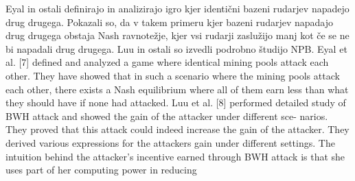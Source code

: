 \documentclass[12pt]{article}
\begin{document}
Eyal \cite{minnersdilemma} in ostali definirajo in analizirajo igro kjer identični bazeni rudarjev napadejo drug drugega. Pokazali so, da v takem primeru kjer bazeni rudarjev napadajo drug drugega obstaja Nash ravnotežje, kjer vsi rudarji zaslužijo manj kot če se ne bi napadali drug drugega. Luu in ostali \cite{powersplitting} so izvedli podrobno študijo NPB. 
Eyal et al. [7] defined and analyzed a game where identical mining pools attack each other. They have showed that in such a scenario where the mining pools attack each other, there exists a Nash equilibrium where all of them earn less than what they should have if none had attacked.
Luu et al. [8] performed detailed study of BWH attack and showed the gain of the attacker under different sce- narios. They proved that this attack could indeed increase the gain of the attacker. They derived various expressions for the attackers gain under different settings. The intuition behind the attacker’s incentive earned through BWH attack
is that she uses part of her computing power in reducing
\end{document}
